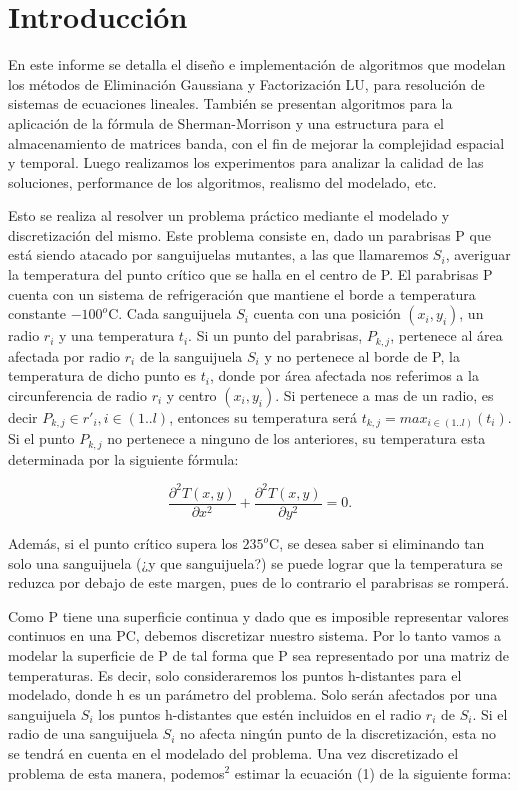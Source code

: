 \section{Introducción}

En este informe se detalla el diseño e implementación de algoritmos que modelan los métodos de Eliminación Gaussiana y Factorización LU,
para resolución de sistemas de ecuaciones lineales. También se presentan algoritmos para la aplicación de la fórmula de Sherman-Morrison y
una estructura para el almacenamiento de matrices banda, con el fin de mejorar la complejidad espacial y temporal. Luego realizamos los experimentos para analizar la calidad de las soluciones, performance de los algoritmos, realismo del modelado, etc.

Esto se realiza al resolver un problema práctico mediante el modelado y discretización del mismo. Este problema consiste en, dado un parabrisas P que está siendo atacado por sanguijuelas mutantes, a las que llamaremos $S_i$, averiguar la temperatura del punto crítico que se halla en el centro de P. El parabrisas P cuenta con un sistema de refrigeración que mantiene el borde a temperatura constante $-100^o$C. Cada sanguijuela $S_i$ cuenta con una posición $(x_i, y_i)$, un radio $r_i$ y una temperatura $t_i$. Si un punto del parabrisas, $P_{k,j}$, pertenece al área afectada por radio $r_i$ de la sanguijuela $S_i$ y no pertenece al borde de P, la temperatura de dicho punto es $t_i$, donde por área afectada nos referimos a la circunferencia de radio $r_i $ y centro $(x_i, y_i)$. Si pertenece a mas de un radio, es decir $P_{k,j} \in {r'_i}, i\in (1..l) $, entonces su temperatura será  $t_{k,j}=max_{i\in (1..l)}(t_i) $. Si el punto $P_{k,j}$ no pertenece a ninguno de los anteriores, su temperatura esta determinada por la siguiente fórmula:

\begin{equation}\label{eq:calor}
\frac{\partial^2T(x,y)}{\partial x^{2}}+\frac{\partial^2 T(x,y)}{\partial y^{2}} = 0.
\end{equation}

Además, si el punto crítico supera los $235^o $C, se desea saber si eliminando tan solo una sanguijuela (¿y que sanguijuela?) se puede lograr que la temperatura se reduzca por debajo de este margen, pues de lo contrario el parabrisas se romperá.

Como P tiene una superficie continua y dado que es imposible representar valores continuos en una PC, debemos discretizar nuestro sistema. Por lo tanto vamos a modelar la superficie de P de tal forma que P sea representado por una matriz de temperaturas. Es decir, solo consideraremos los puntos h-distantes para el modelado, donde h es un parámetro del problema. 
Solo serán afectados por una sanguijuela $S_i$ los puntos h-distantes que estén incluidos en el radio $r_i$ de $S_i$. Si el radio de una sanguijuela $S_i$ no afecta ningún punto de la discretización, esta no se tendrá en cuenta en el modelado del problema. Una vez discretizado el problema de esta manera, podemos$^2$ estimar la ecuación (1) de la siguiente forma:

